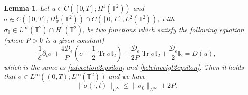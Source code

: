 \documentclass[12pt,a4paper]{article}
\newtheorem{lemma}[theorem]{Lemma}
\theoremstyle{definition}
\theoremstyle{remark}
\numberwithin{equation}{section}
\DeclareMathOperator{\Tr}{Tr}
\begin{document}
\begin{lemma} \label{Lpestimatelemma}
Let $u \in C([0,T];H^1 (\mathbb{T}^2))$ and $\sigma \in C([0,T];H^1_w (\mathbb{T}^2)) \cap C([0,T]; L^2 (\mathbb{T}^2))$, with $\sigma_0 \in L^\infty (\mathbb{T}^2) \cap H^1 (\mathbb{T}^2)$, be two functions which satisfy the following equation (where $P > 0$ is a given constant)
\begin{equation}
\dfrac{1}{\mathcal E} \partial_t \sigma + \dfrac{4 \mathcal{D}_\epsilon}{P} (\sigma - \frac{1}{2} \Tr \sigma \mathbb I_2) + \dfrac{\mathcal{D}_\epsilon}{2P} \Tr \sigma \mathbb I_2 + \dfrac{\mathcal{D}_\epsilon}{2} \mathbb I_2  = D(u),
\end{equation}
which is the same as \eqref{advection2epsilon} and \eqref{kelvinvoigt2epsilon}. Then it holds that $\sigma \in L^\infty ((0,T); L^\infty (\mathbb{T}^2))$ and we have
\begin{equation}
\lVert \sigma (\cdot, t) \rVert_{L^\infty} \leq \lVert \sigma_0 \rVert_{L^\infty} + 2 P.
\end{equation}
\end{lemma}
\end{document}
